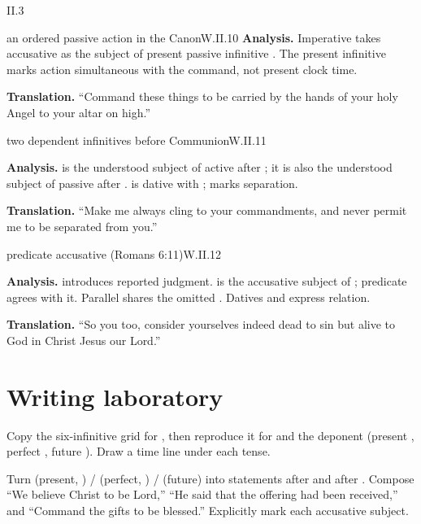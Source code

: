 \begin{courseunit}{II.3}
\begin{workedexample}{an ordered passive action in the Canon}{W.II.10}
\textbf{Analysis.}  Imperative  takes accusative  as the subject of
present passive infinitive .  The present infinitive marks action simultaneous
with the command, not present clock time.

\textbf{Translation.}  ``Command these things to be carried by the hands of your holy Angel
to your altar on high.''
\end{workedexample}

\begin{workedexample}{two dependent infinitives before Communion}{W.II.11}

\textbf{Analysis.}   is the understood subject of active  after
; it is also the understood subject of passive  after
.   is dative with ;  marks
separation.

\textbf{Translation.}  ``Make me always cling to your commandments, and never permit me to be
separated from you.''
\end{workedexample}

\begin{workedexample}{predicate accusative (Romans 6:11)}{W.II.12}

\textbf{Analysis.}   introduces reported judgment.   is the
accusative subject of ; predicate  agrees with it.  Parallel
 shares the omitted .  Datives  and 
express relation.

\textbf{Translation.}  ``So you too, consider yourselves indeed dead to sin but alive to God
in Christ Jesus our Lord.''
\end{workedexample}

\section{Writing laboratory}

Copy the six-infinitive grid for , then reproduce it for  and the
deponent  (present , perfect , future
).  Draw a time line under each tense.

Turn  (present, ) /  (perfect,
) /  (future) into statements after  and
after .  Compose ``We believe Christ to be Lord,'' ``He said that the
offering had been received,'' and ``Command the gifts to be blessed.''  Explicitly mark each
accusative subject.



\end{courseunit}


